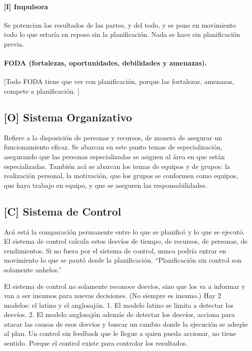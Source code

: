 \hypertarget{impulsora}{%
\paragraph{{[}I{]} Impulsora}\label{impulsora}}
Se potencian los resultados de las
partes, y del todo, y se pone en movimiento todo lo que estaría en
reposo sin la planificación. Nada se hace sin planificación previa.

\paragraph*{FODA (fortalezas, oportunidades, debilidades y amenazas).} [Todo FODA tiene que ver con planificación, porque las
fortalezas, amenazas, compete a planificación.%
]

\hypertarget{sistema-organizativo}{%
\subsection{{[}O{]} Sistema Organizativo}\label{sistema-organizativo}}

Refiere a la disposición de personas y recursos, de manera de asegurar
un funcionamiento eficaz. Se abarcan en este punto temas de
especialización, asegurando que las personas especializadas se asignen
al área en que están especializadas. También acá se abarcan los temas de
equipos y de grupos: la realización personal, la motivación, que los
grupos se conformen como equipos, que haya trabajo en equipo, y que se
aseguren las responsabilidades.

\hypertarget{sistema-de-control}{%
\subsection{{[}C{]} Sistema de Control}\label{sistema-de-control}}

Acá está la comparación permanente entre lo que se planificó y lo que se
ejecutó. El sistema de control calcula estos desvíos de tiempo, de
recursos, de personas, de rendimientos. Si no fuera por el sistema de
control, nunca podría entrar en movimiento lo que se pautó desde la
planificación. ``Planificación sin control son solamente anhelos.''

El sistema de control no solamente reconoce desvíos, sino que los va a
informar y van a ser insumos para nuevas decisiones. (No siempre es
insumo.) Hay 2 modelos: el latino y el anglosajón. 1. El modelo latino se
limita a detectar los desvíos. 2. El modelo anglosajón además de detectar los desvíos, acciona para atacar
las causas de esos desvíos y buscar un cambio donde la ejecución se
adeqúe al plan. Un control sin feedback que le llegue a quien pueda
accionar, no tiene sentido. Porque el control existe para controlar los
resultados.

